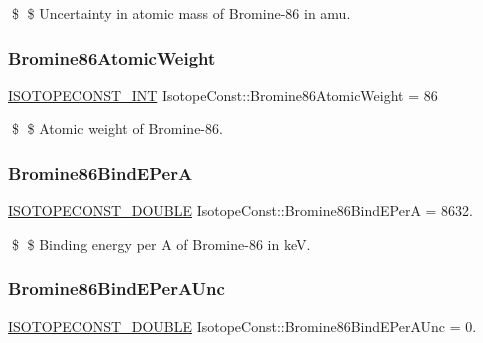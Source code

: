 \$ \$ Uncertainty in atomic mass of Bromine-\/86 in amu. \mbox{\label{group___isotope_const-_bromine-_br86_ga7f596459dbaf3f36ede84da4ed1e4b80}} 
\subsubsection{\texorpdfstring{Bromine86\+Atomic\+Weight}{Bromine86AtomicWeight}}
{\footnotesize\ttfamily \mbox{\hyperlink{group___isotope_const-_macros_ga5f18360b3e99483a35c32d789e62621c}{I\+S\+O\+T\+O\+P\+E\+C\+O\+N\+S\+T\+\_\+\+I\+NT}} Isotope\+Const\+::\+Bromine86\+Atomic\+Weight = 86}

\$ \$ Atomic weight of Bromine-\/86. \mbox{\label{group___isotope_const-_bromine-_br86_ga41cd032a0dc87c2df55a4efbd078ebd8}} 
\subsubsection{\texorpdfstring{Bromine86\+Bind\+E\+PerA}{Bromine86BindEPerA}}
{\footnotesize\ttfamily \mbox{\hyperlink{group___isotope_const-_macros_ga8f45a7272ce02c0b4c65c44636ed719a}{I\+S\+O\+T\+O\+P\+E\+C\+O\+N\+S\+T\+\_\+\+D\+O\+U\+B\+LE}} Isotope\+Const\+::\+Bromine86\+Bind\+E\+PerA = 8632.}

\$ \$ Binding energy per A of Bromine-\/86 in keV. \mbox{\label{group___isotope_const-_bromine-_br86_ga178816d0ce161e8d776fb3cc3f369037}} 
\subsubsection{\texorpdfstring{Bromine86\+Bind\+E\+Per\+A\+Unc}{Bromine86BindEPerAUnc}}
{\footnotesize\ttfamily \mbox{\hyperlink{group___isotope_const-_macros_ga8f45a7272ce02c0b4c65c44636ed719a}{I\+S\+O\+T\+O\+P\+E\+C\+O\+N\+S\+T\+\_\+\+D\+O\+U\+B\+LE}} Isotope\+Const\+::\+Bromine86\+Bind\+E\+Per\+A\+Unc = 0.}


